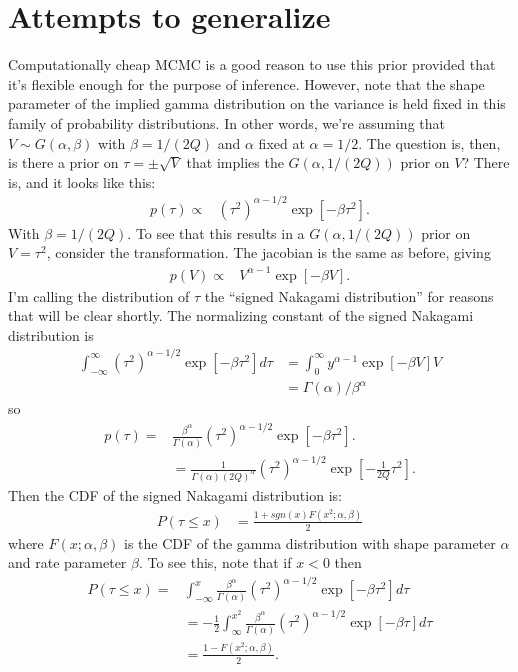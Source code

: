 \documentclass{article}\usepackage[]{graphicx}\usepackage[]{color}
\begin{document}
\section{Attempts to generalize}
Computationally cheap MCMC is a good reason to use this prior provided that it's flexible enough for the purpose of inference. However, note that the shape parameter of the implied gamma distribution on the variance is held fixed in this family of probability distributions. In other words, we're assuming that $V\sim G(\alpha, \beta)$ with $\beta=1/(2Q)$ and $\alpha$ fixed at $\alpha=1/2$. The question is, then, is there a prior on $\tau=\pm \sqrt{V}$ that implies the $G(\alpha,1/(2Q))$ prior on $V$? There is, and it looks like this:
\begin{align*}
  p(\tau)\propto &(\tau^2)^{\alpha - 1/2}\exp\left[-\beta\tau^2\right].
\end{align*}
With $\beta=1/(2Q)$. To see that this results in a $G(\alpha,1/(2Q))$ prior on $V=\tau^2$, consider the transformation. The jacobian is the same as before, giving
\begin{align*}
  p(V)\propto & V^{\alpha-1}\exp\left[-\beta V\right].
\end{align*}
I'm calling the distribution of $\tau$ the ``signed Nakagami distribution'' for reasons that will be clear shortly. The normalizing constant of the signed Nakagami distribution is
\begin{align*}
  \int_{-\infty}^\infty (\tau^2)^{\alpha - 1/2}\exp\left[-\beta\tau^2\right]d\tau & = \int_{0}^\infty y^{\alpha -1} \exp\left[-\beta V\right]V \\
  & = \Gamma(\alpha)/\beta^\alpha
\end{align*}
so
\begin{align*}
p(\tau) = & \frac{\beta^\alpha}{\Gamma(\alpha)}(\tau^2)^{\alpha-1/2}\exp\left[-\beta\tau^2\right].\\
&= \frac{1}{\Gamma(\alpha) (2Q)^\alpha}(\tau^2)^{\alpha-1/2}\exp\left[-\frac{1}{2Q}\tau^2\right].
\end{align*}
Then the CDF of the signed Nakagami distribution is:
\begin{align*}
  P(\tau\leq x) & = \frac{1 + sgn(x)F(x^2;\alpha,\beta)}{2}
\end{align*}
where $F(x;\alpha,\beta)$ is the CDF of the gamma distribution with shape parameter $\alpha$ and rate parameter $\beta$. To see this, note that if $x<0$ then
\begin{align*}
  P(\tau \leq x) = &\int_{-\infty}^x \frac{\beta^\alpha}{\Gamma(\alpha) }(\tau^2)^{\alpha-1/2}\exp\left[-\beta\tau^2\right] d\tau \\
    &=-\frac{1}{2}\int_\infty^{x^2} \frac{\beta^\alpha}{\Gamma(\alpha) }(\tau^2)^{\alpha-1/2}\exp\left[-\beta \tau\right] d\tau\\
    &= \frac{1 - F(x^2;\alpha,\beta)}{2}.
\end{align*}
\end{document}
